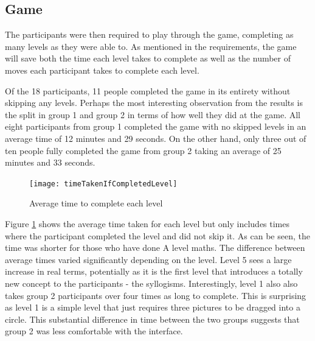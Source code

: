 \documentclass[12pt,a4paper]{report}
\begin{document}
\subsection{Game}

The participants were then required to play through the game, completing as many levels as they were able to. As mentioned in the requirements, the game will save both the time each level takes to complete as well as the number of moves each participant takes to complete each level. 

Of the 18 participants, 11 people completed the game in its entirety without skipping any levels. Perhaps the most interesting observation from the results is the split in group 1 and group 2 in terms of how well they did at the game. All eight participants from group 1 completed the game with no skipped levels in an average time of 12 minutes and 29 seconds. On the other hand, only three out of ten people fully completed the game from group 2 taking an average of 25 minutes and 33 seconds.


\begin{figure}[h]
\centering
    \texttt{[image: timeTakenIfCompletedLevel]}
    \caption{Average time to complete each level}
        \label{fig:timeTakenIfCompletedLevel}
\end{figure}
\FloatBarrier

Figure \ref{fig:timeTakenIfCompletedLevel} shows the average time taken for each level but only includes times where the participant completed the level and did not skip it. As can be seen, the time was shorter for those who have done A level maths. The difference between average times varied significantly depending on the level. Level 5 sees a large increase in real terms, potentially as it is the first level that introduces a totally new concept to the participants - the syllogisms. Interestingly, level 1 also also takes group 2 participants over four times as long to complete. This is surprising as level 1 is a simple level that just requires three pictures to be dragged into a circle. This substantial difference in time between the two groups suggests that group 2 was less comfortable with the interface.
\end{document}
